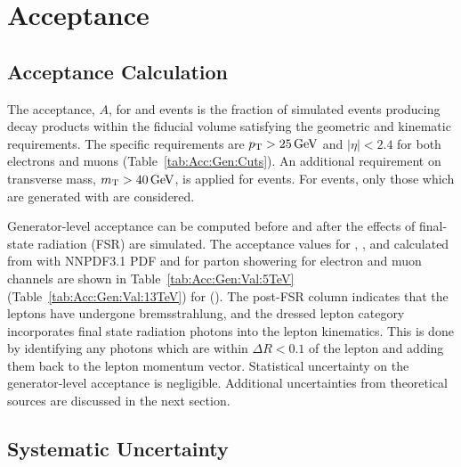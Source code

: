\chapter{Acceptance}

\section{Acceptance Calculation}
The acceptance, $A$, for \Wpm and \Z events is the fraction of simulated events producing decay products within the fiducial volume satisfying the geometric and kinematic requirements. The specific requirements are $p_{\mathrm{T}}>25\,\text{Ge\hspace{-.08em}V}$ and $|\eta| < 2.4$ for both electrons and muons (Table~\ref{tab:Acc:Gen:Cuts}). An additional requirement on transverse mass, $m_{\mathrm{T}} > 40 \,\text{Ge\hspace{-.08em}V}$, is applied for \Wpm events. For \Z events, only those which are generated with \masswindow are considered.

Generator-level acceptance can be computed before and after the effects of final-state radiation (FSR) are simulated. The acceptance values for \Wp, \Wm, and \Z calculated from \aMCATNLO with NNPDF3.1 PDF and  for parton showering for electron and muon channels are shown in Table~\ref{tab:Acc:Gen:Val:5TeV} (Table~\ref{tab:Acc:Gen:Val:13TeV}) for \serag (\serah). The post-FSR column indicates that the leptons have undergone bremsstrahlung, and the dressed lepton category incorporates final state radiation photons into the lepton kinematics. This is done by identifying any photons which are within $\Delta R < 0.1$ of the lepton and adding them back to the lepton momentum vector. Statistical uncertainty on the generator-level acceptance is negligible. Additional uncertainties from theoretical sources are discussed in the next section.



% 
% 

\section{Systematic Uncertainty}\label{ch:acc:unc}

